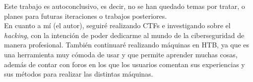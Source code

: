 Este trabajo es autoconclusivo, es decir, no se han quedado temas por tratar, o planes para futuras iteraciones o trabajos posteriores.\\

En cuanto a mí (el autor), seguiré realizando \acrshort{CTF}s e investigando sobre el \textit{hacking}, con la intención de poder dedicarme al mundo de la ciberseguridad de manera profesional. También continuaré realizando máquinas en \acrshort{HTB}, ya que es una herramienta muy cómoda de usar y que permite aprender muchas cosas, además de contar con foros en los que los usuarios comentan sus experiencias y sus métodos para realizar las distintas máquinas.